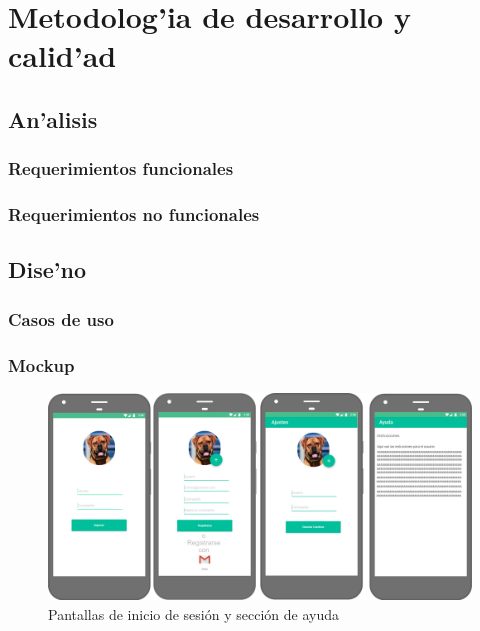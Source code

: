 \chapter{Metodolog'ia de desarrollo y calid'ad}
\section{An'alisis}
\subsection{Requerimientos funcionales}

\subsection{Requerimientos no funcionales}

\section{Dise'no}
\subsection{Casos de uso}

\subsection{Mockup}
\begin{center}
\begin{figure}
\includegraphics[scale=0.2]{m1.png} 
\caption{Pantallas de inicio de sesión y sección de ayuda}
\end{figure}
\end{center}

